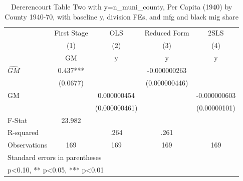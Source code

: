 \begin{table}[htbp]\centering
\def\sym#1{\ifmmode^{#1}\else\(^{#1}\)\fi}
\caption{Dererencourt Table Two with y=n\_muni\_county, Per Capita (1940) by County 1940-70, with baseline y, division FEs, and mfg and black mig share}
\begin{tabular}{l*{4}{c}}
\toprule
                    & First Stage   &         OLS   &Reduced Form   &        2SLS   \\
                    &\multicolumn{1}{c}{(1)}&\multicolumn{1}{c}{(2)}&\multicolumn{1}{c}{(3)}&\multicolumn{1}{c}{(4)}\\
                    &\multicolumn{1}{c}{GM}&\multicolumn{1}{c}{y}&\multicolumn{1}{c}{y}&\multicolumn{1}{c}{y}\\
\midrule
$\hat{GM}$          &       0.437***&               &-0.000000263   &               \\
                    &    (0.0677)   &               &(0.000000446)   &               \\
\addlinespace
GM                  &               & 0.000000454   &               &-0.000000603   \\
                    &               &(0.000000461)   &               &(0.00000101)   \\
\midrule
F-Stat              &      23.982   &               &               &               \\
R-squared           &               &        .264   &        .261   &               \\
Observations        &         169   &         169   &         169   &         169   \\
\bottomrule
\multicolumn{5}{l}{\footnotesize Standard errors in parentheses}\\
\multicolumn{5}{l}{\footnotesize * p<0.10, ** p<0.05, *** p<0.01}\\
\end{tabular}
\end{table}
